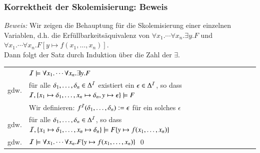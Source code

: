 \documentclass[onlymath]{beamer}
\begin{document}
\begin{frame}\frametitle{Korrektheit der Skolemisierung: Beweis}

\medskip

\emph{Beweis:} Wir zeigen die Behauptung für die Skolemisierung einer einzelnen Variablen, d.h. die Erfüllbarkeitsäquivalenz von $\forall x_1.\cdots\forall x_n.\exists y.F$ und $\forall x_1.\cdots\forall x_n.F[y\mapsto f(x_1,\ldots,x_n)]$.\\\pause
Dann folgt der Satz durch Induktion über die Zahl der $\exists$.\bigskip\pause

\begin{tabular}{lp{8cm}}
	& $\mathcal{I}\models \forall x_1.\cdots\forall x_n.\exists y.F$\\\pause
gdw. & für alle $\delta_1,\ldots, \delta_n\in\Delta^{\mathcal{I}}$ existiert ein $\epsilon\in\Delta^{\mathcal{I}}$, so dass $\mathcal{I},\{x_1\mapsto\delta_1,\ldots,x_n\mapsto \delta_n,y\mapsto\epsilon\}\models F$\\[-2ex]\pause
	& \alert{Wir definieren:} $f^{\mathcal{I}}(\delta_1,\ldots, \delta_n)\mathrel{:=}\epsilon$ für ein solches $\epsilon$\\\pause
gdw. & für alle $\delta_1,\ldots, \delta_n\in\Delta^{\mathcal{I}}$, so dass\newline $\mathcal{I},\{x_1\mapsto\delta_1,\ldots,x_n\mapsto \delta_n\}\models F\{y\mapsto f(x_1,\ldots,x_n)\}$\\\pause
gdw. & $\mathcal{I}\models \forall x_1.\cdots\forall x_n.F\{y\mapsto f(x_1,\ldots,x_n)\}$ \hspace{5cm}\qed
\end{tabular}
% 


\end{frame}
\end{document}
